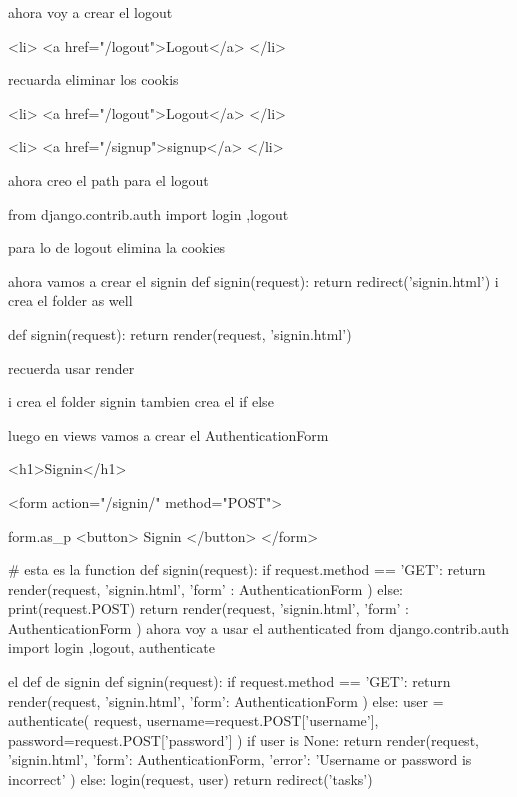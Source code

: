 {{{{{{ ahora voy a crear el logout 
   {%
   <li>
   <a href="/logout">Logout</a>
</li>
{%
recuarda eliminar los cookis

 {%
 <li>
 <a href="/logout">Logout</a>
</li>
{%
<li>
 <a href="/signup">signup</a>
</li>
{%

ahora creo el path para el logout

from django.contrib.auth import login ,logout

para lo de logout elimina la cookies


ahora vamos a crear el signin def signin(request):
return redirect('signin.html') 
i crea el folder as well 

def signin(request):
    return render(request, 'signin.html')

    recuerda usar render 

i crea el folder signin tambien crea el if else 

luego en views vamos a crear el AuthenticationForm


{%

{%
<h1>Signin</h1>

<form action="/signin/" method="POST">
    {%
    {{ form.as_p }}
    <button>
        Signin
    </button>
</form>
{%
# esta es la function 
def signin(request):
    if request.method == 'GET':
        return render(request, 'signin.html', {
        'form' : AuthenticationForm
    })
    else:
        print(request.POST)
        return render(request, 'signin.html', {
        'form' : AuthenticationForm
    })
ahora voy a usar el authenticated
from django.contrib.auth import login ,logout, authenticate


el def de signin 
def signin(request):
    if request.method == 'GET':
        return render(request, 'signin.html', {
            'form': AuthenticationForm
        })
    else:
        user = authenticate(
            request, 
            username=request.POST['username'], 
            password=request.POST['password']
        )
        if user is None:
            return render(request, 'signin.html', {
                'form': AuthenticationForm,
                'error': 'Username or password is incorrect'
            })
        else:
            login(request, user)
            return redirect('tasks')

}}}}}}}}}}}}}}}
